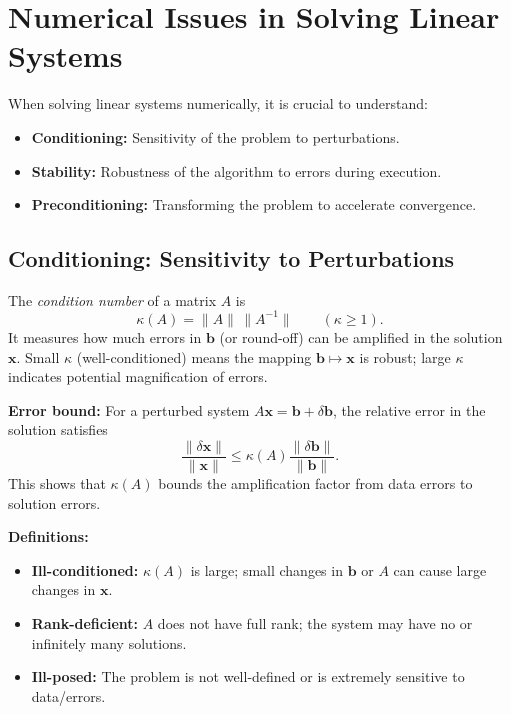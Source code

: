 \section{Numerical Issues in Solving Linear Systems}

When solving linear systems numerically, it is crucial to understand:
\begin{itemize}
    \item \textbf{Conditioning:} Sensitivity of the problem to perturbations.
    \item \textbf{Stability:} Robustness of the algorithm to errors during execution.
    \item \textbf{Preconditioning:} Transforming the problem to accelerate convergence.
\end{itemize}

\subsection[Conditioning]{Conditioning: Sensitivity to Perturbations}
The \emph{condition number} of a matrix $A$ is
\begin{equation}
    \kappa(A)=\|A\|\,\|A^{-1}\| \qquad (\kappa \geq 1).
\end{equation}
It measures how much errors in $\mathbf{b}$ (or round-off) can be amplified in the solution $\mathbf{x}$. Small $\kappa$ (well-conditioned) means the mapping $\mathbf{b}\mapsto\mathbf{x}$ is robust; large $\kappa$ indicates potential magnification of errors.

\textbf{Error bound:} For a perturbed system $A\mathbf{x} = \mathbf{b} + \delta\mathbf{b}$, the relative error in the solution satisfies
\begin{equation}
    \frac{\|\delta\mathbf{x}\|}{\|\mathbf{x}\|} \leq \kappa(A) \frac{\|\delta\mathbf{b}\|}{\|\mathbf{b}\|}.
\end{equation}
This shows that $\kappa(A)$ bounds the amplification factor from data errors to solution errors.

\textbf{Definitions:}
\begin{itemize}
    \item \textbf{Ill-conditioned:} $\kappa(A)$ is large; small changes in $\mathbf{b}$ or $A$ can cause large changes in $\mathbf{x}$.
    \item \textbf{Rank-deficient:} $A$ does not have full rank; the system may have no or infinitely many solutions.
    \item \textbf{Ill-posed:} The problem is not well-defined or is extremely sensitive to data/errors.
\end{itemize}

